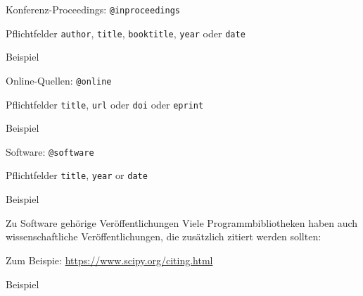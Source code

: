 \begin{frame}[fragile]{Konferenz-Proceedings: \lstinline+@inproceedings+}
  \begin{block}{Pflichtfelder}
    \texttt{author}, \hspace{2em}
    \texttt{title}, \hspace{2em}
    \texttt{booktitle}, \hspace{2em}
    \texttt{year} oder \texttt{date}
  \end{block}

  \begin{block}{Beispiel}
    
  \end{block}
\end{frame}

\begin{frame}[fragile]{Online-Quellen: \lstinline+@online+}
  \begin{block}{Pflichtfelder}
    \texttt{title}, \hspace{2em}
    \texttt{url} oder \texttt{doi} oder \texttt{eprint} \hspace{2em}
  \end{block}

  \begin{block}{Beispiel}
    
  \end{block}
\end{frame}

\begin{frame}[fragile]{Software: \lstinline+@software+}
  \begin{block}{Pflichtfelder}
    \texttt{title}, \hspace{2em}
    \texttt{year} or \texttt{date} \hspace{2em}
  \end{block}

  \begin{block}{Beispiel}
    
  \end{block}
\end{frame}

\begin{frame}[fragile]{Zu Software gehörige Veröffentlichungen}
  Viele Programmbibliotheken haben auch wissenschaftliche Veröffentlichungen,
  die zusätzlich zitiert werden sollten:

  Zum Beispie: \url{https://www.scipy.org/citing.html}

  \begin{block}{Beispiel}
    \footnotesize
    
  \end{block}

\end{frame}

